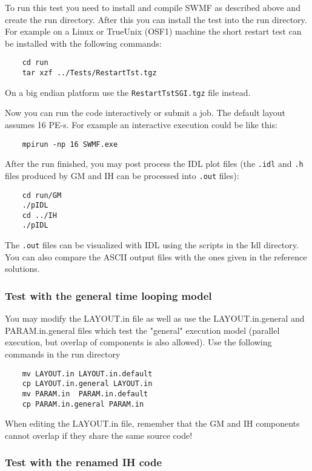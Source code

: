 To run this test you need to install and compile SWMF as described
above and create the run directory. After this you can install the
test into the run directory.  For example on a Linux or TrueUnix
(OSF1) machine the short restart test can be installed with the
following commands:
\begin{verbatim}
	cd run
	tar xzf ../Tests/RestartTst.tgz
\end{verbatim}
On a big endian platform use the {\tt RestartTstSGI.tgz} file instead.

Now you can run the code interactively or submit a job.  The default
layout assumes 16 PE-s. For example an interactive execution could be
like this:
\begin{verbatim}
	mpirun -np 16 SWMF.exe
\end{verbatim}
After the run finished, you may post process the IDL plot files (the
{\tt .idl} and {\tt .h} files produced by GM and IH can be processed
into {\tt .out} files):
\begin{verbatim}
	cd run/GM
	./pIDL
	cd ../IH
	./pIDL
\end{verbatim}
The {\tt .out} files can be visualized with IDL using the scripts in
the Idl directory.  You can also compare the ASCII output files with
the ones given in the reference solutions.

\subsubsection{Test with the general time looping model}

You may modify the LAYOUT.in file as well as use the LAYOUT.in.general
and PARAM.in.general files which test the "general" execution model
(parallel execution, but overlap of components is also allowed). Use
the following commands in the run directory
\begin{verbatim}
	mv LAYOUT.in LAYOUT.in.default
	cp LAYOUT.in.general LAYOUT.in
	mv PARAM.in  PARAM.in.default
	cp PARAM.in.general PARAM.in 
\end{verbatim}
When editing the LAYOUT.in file, remember that the GM and IH
components cannot overlap if they share the same source code!

\subsubsection{Test with the renamed IH code}

